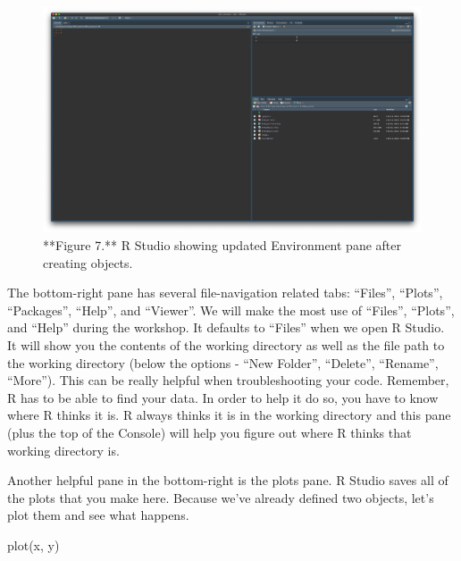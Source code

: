 \documentclass[
]{article}
\newenvironment{Shaded}{\begin{snugshade}}{\end{snugshade}}
\newcommand{\FunctionTok}[1]{\textcolor[rgb]{0.00,0.00,0.00}{#1}}
\newcommand{\NormalTok}[1]{#1}
\begin{document}
\begin{figure}

{\centering \includegraphics{images/Rst_env} 

}

\caption{**Figure 7.** R Studio showing updated Environment pane after creating objects.}\label{fig:screenshot of Rstudio step 1}
\end{figure}

\hfill\break
\hfill\break

The bottom-right pane has several file-navigation related tabs:
``Files'', ``Plots'', ``Packages'', ``Help'', and ``Viewer''. We will
make the most use of ``Files'', ``Plots'', and ``Help'' during the
workshop. It defaults to ``Files'' when we open R Studio. It will show
you the contents of the working directory as well as the file path to
the working directory (below the options - ``New Folder'', ``Delete'',
``Rename'', ``More''). This can be really helpful when troubleshooting
your code. Remember, R has to be able to find your data. In order to
help it do so, you have to know where R thinks it is. R always thinks it
is in the working directory and this pane (plus the top of the Console)
will help you figure out where R thinks that working directory is.

Another helpful pane in the bottom-right is the plots pane. R Studio
saves all of the plots that you make here. Because we've already defined
two objects, let's plot them and see what happens.

\begin{Shaded}
\begin{Highlighting}[]
\FunctionTok{plot}\NormalTok{(x, y)}
\end{Highlighting}
\end{Shaded}
\end{document}
